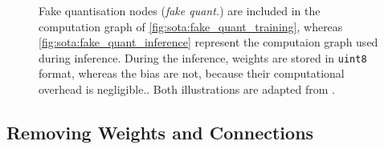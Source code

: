 \begin{figure}[htbp]
\centering
{}
\caption{Fake quantisation nodes (\emph{fake quant.}) are included in the
computation graph of \cref{fig:sota:fake_quant_training}, whereas
\cref{fig:sota:fake_quant_inference} represent the computaion graph used during
inference. During the inference, weights are stored in \texttt{uint8} format,
whereas the bias are not, because their computational overhead is
negligible.\cite{DBLP:conf/cvpr/JacobKCZTHAK18}. Both illustrations are adapted
from \cite{DBLP:conf/cvpr/JacobKCZTHAK18}.}
\label{fig:sota:fake_quant}
\end{figure}

\subsection{Removing Weights and Connections}\label{sec:sota:pruning}

